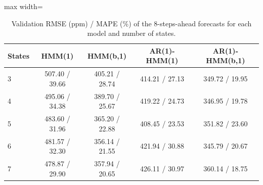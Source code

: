\begin{table}[ht]
\centering
\begin{adjustbox}{max width=\textwidth}
\begin{tabular}{lcccc}
\hline
States & HMM(1) & HMM(b,1) & AR(1)-HMM(1) & AR(1)-HMM(b,1) \\
\hline
3 & 507.40 / 39.66 & 405.21 / 28.74 & 414.21 / 27.13 & 349.72 / 19.95 \\
4 & 495.06 / 34.38 & 389.70 / 25.67 & 419.22 / 24.73 & 346.95 / 19.78 \\
5 & 483.60 / 31.96 & 365.20 / 22.88 & 408.45 / 23.53 & 351.82 / 23.60 \\
6 & 481.57 / 32.30 & 356.14 / 21.55 & 421.94 / 30.88 & 345.79 / 20.67 \\
7 & 478.87 / 29.90 & 357.94 / 20.65 & 426.11 / 30.97 & 360.14 / 18.75 \\
\hline
\end{tabular}
\end{adjustbox}
\caption{Validation RMSE (ppm) / MAPE (\%) of the 8-steps-ahead forecasts for each model and number of states.}
\label{tab:predictive_metrics_room_015_calibrated_anchor_random_search_val_h8}
\end{table}
